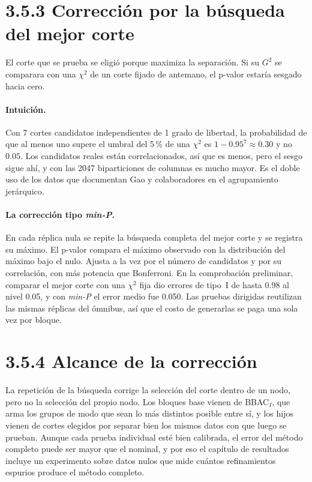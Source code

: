 \documentclass[11pt,a4paper]{article}
\begin{document}
\section{3.5.3 Corrección por la búsqueda del mejor corte}

El corte que se prueba se eligió porque maximiza la separación. Si su $G^2$ se
comparara con una $\chi^2$ de un corte fijado de antemano, el p-valor estaría
sesgado hacia cero.

\paragraph{Intuición.} Con 7 cortes candidatos independientes de 1 grado de
libertad, la probabilidad de que al menos uno supere el umbral del 5\,\% de una
$\chi^2$ es $1-0.95^7\approx\mathbf{0.30}$ y no $0.05$. Los candidatos reales están
correlacionados, así que es menos, pero el sesgo sigue ahí, y con las 2047
biparticiones de columnas es mucho mayor. Es el doble uso de los datos que
documentan Gao y colaboradores en el agrupamiento jerárquico.

\paragraph{La corrección tipo \emph{min-P}.} En cada réplica nula se repite la
búsqueda completa del mejor corte y se registra su máximo. El p-valor compara el
máximo observado con la distribución del máximo bajo el nulo. Ajusta a la vez por el
número de candidatos y por su correlación, con más potencia que Bonferroni. En la
comprobación preliminar, comparar el mejor corte con una $\chi^2$ fija dio errores de
tipo~I de hasta 0.98 al nivel 0.05, y con \emph{min-P} el error medio fue 0.050. Las
pruebas dirigidas reutilizan las mismas réplicas del ómnibus, así que el costo de
generarlas se paga una sola vez por bloque.

\section{3.5.4 Alcance de la corrección}

La repetición de la búsqueda corrige la selección del corte dentro de un nodo, pero
no la selección del propio nodo. Los bloques base vienen de BBAC$_I$, que arma los
grupos de modo que sean lo más distintos posible entre sí, y los hijos vienen de
cortes elegidos por separar bien los mismos datos con que luego se prueban. Aunque
cada prueba individual esté bien calibrada, el error del método completo puede
ser mayor que el nominal, y por eso el capítulo de resultados incluye un experimento
sobre datos nulos que mide cuántos refinamientos espurios produce el método completo.
\end{document}
